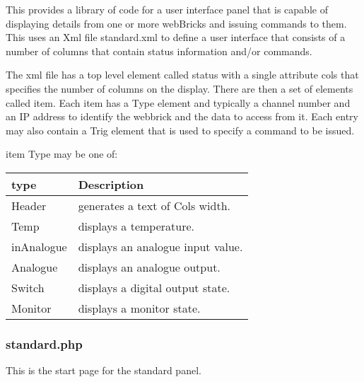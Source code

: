 This provides a library of code for a user interface panel that is capable of displaying details from one or more 
webBricks and issuing commands to them. This uses an Xml file standard.xml to define a user interface that consists 
of a number of columns that contain status information and/or commands.

The xml file has a top level element called status with a single attribute cols that specifies the number of columns on the
display. There are then a set of elements called item. Each item has a Type element and typically a channel number and an
IP address to identify the webbrick and the data to access from it. Each entry may also contain a Trig element that is used to
specify a command to be issued.

item Type may be one of:

\begin{tabular}{l|p{12cm}}
    type&Description\\
    \hline
    Header&generates a text of Cols width.\\
    Temp&displays a temperature.\\
    inAnalogue&displays an analogue input value.\\
    Analogue&displays an analogue output.\\
    Switch&displays a digital output state.\\
    Monitor&displays a monitor state.\\
\end{tabular}

\subsubsection{standard.php}

This is the start page for the standard panel.

